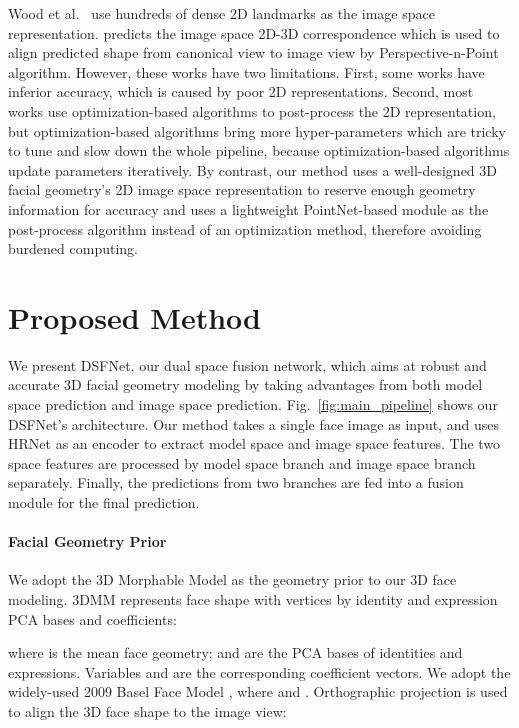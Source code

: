 \documentclass[10pt,twocolumn,letterpaper]{article}
\begin{document}
Wood et al.~\cite{wood20223d} use hundreds of dense 2D landmarks as the image space representation. \cite{kao2022single} predicts the image space 2D-3D correspondence which is used to align predicted shape from canonical view to image view by Perspective-n-Point algorithm. However, these works have two limitations. First, some works have inferior accuracy, which is caused by poor 2D representations. Second, most works use optimization-based algorithms to post-process the 2D representation, but optimization-based algorithms bring more hyper-parameters which are tricky to tune and slow down the whole pipeline, because optimization-based algorithms update parameters iteratively. By contrast, our method uses a well-designed 3D facial geometry's 2D image space representation to reserve enough geometry information for accuracy and uses a lightweight PointNet-based module as the post-process algorithm instead of an optimization method, therefore avoiding burdened computing.


\section{Proposed Method}
\label{sec:meth}
We present DSFNet, our dual space fusion network, which aims at robust and accurate 3D facial geometry modeling by taking advantages from both model space prediction and image space prediction. 
Fig.~\ref{fig:main_pipeline} shows our DSFNet's architecture.
Our method takes a single face image as input, and uses HRNet \cite{SunXLW19} as an encoder  to extract model space and image space features. 
The two space features are processed by model space branch and image space branch separately. Finally, the predictions from two branches are fed into a fusion module for the final prediction. 

\vspace{-0.3cm}
\paragraph{Facial Geometry Prior}
\label{subsec:meth_1}
We adopt the 3D Morphable Model as the geometry prior to our 3D face modeling. 
3DMM represents face shape  with  vertices by identity and expression PCA bases and coefficients:

where  is the mean face geometry;  and  are the PCA bases of identities and expressions. Variables  and  are the corresponding coefficient vectors. We adopt the widely-used 2009 Basel Face Model \cite{paysan20093d}, where  and . 
Orthographic projection is used to align the 3D face shape to the image view:
\end{document}
